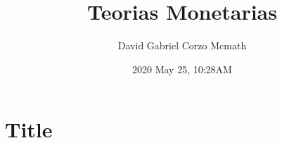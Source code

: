 \documentclass{book}
\title{Teorias Monetarias}
\date{2020 May 25, 10:28AM}
\author{David Gabriel Corzo Mcmath}
\begin{document}
\maketitle
 \tableofcontents

\chapter{Title}



\end{document}
